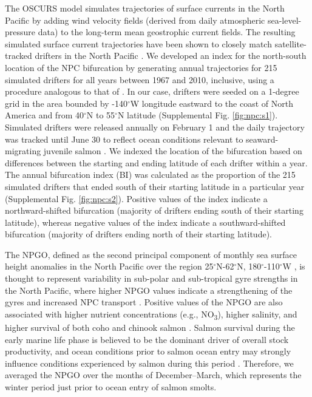 The OSCURS model simulates trajectories of surface currents in the North Pacific
by adding wind velocity fields (derived from daily atmospheric
sea-level-pressure data) to the long-term mean geostrophic current fields. The
resulting simulated surface current trajectories have been shown to closely
match satellite-tracked drifters in the North Pacific \citep{Ingraham1997a}. We
developed an index for the north-south location of the NPC bifurcation by
generating annual trajectories for 215 simulated drifters for all years between
1967 and 2010, inclusive, using a procedure analogous to that of
\citet{Watters2008a}. In our case, drifters were seeded on a 1-degree grid in
the area bounded by -140$^{\circ}$W longitude eastward to the coast of North
America and from 40$^{\circ}$N to 55$^{\circ}$N latitude (Supplemental Fig.
\ref{fig:npc:s1}). Simulated drifters were released annually on February 1 and
the daily trajectory was tracked until June 30 to reflect ocean conditions
relevant to seaward-migrating juvenile salmon \citep{DiLorenzo2013a}. We indexed
the location of the bifurcation based on differences between the starting and
ending latitude of each drifter within a year. The annual bifurcation index (BI)
was calculated as the proportion of the 215 simulated drifters that ended south
of their starting latitude in a particular year (Supplemental Fig.
\ref{fig:npc:s2}). Positive values of the index indicate a northward-shifted
bifurcation (majority of drifters ending south of their starting latitude),
whereas negative values of the index indicate a southward-shifted bifurcation
(majority of drifters ending north of their starting latitude).

The NPGO, defined as the second principal component of monthly sea surface
height anomalies in the North Pacific over the region
25$^{\circ}$N-62$^{\circ}$N, 180$^{\circ}$-110$^{\circ}$W
\citep{Di-Lorenzo2008a}, is thought to represent variability in sub-polar and
sub-tropical gyre strengths in the North Pacific, where higher NPGO values
indicate a strengthening of the gyres and increased NPC transport
\citep{Chhak2009a, Di-Lorenzo2009a, Di-Lorenzo2008a}. Positive values of the
NPGO are also associated with higher nutrient concentrations (e.g.,
NO\textsubscript{3}), higher salinity, and higher survival of both coho and
chinook salmon \citep{Di-Lorenzo2008a, Di-Lorenzo2009a, Kilduff2015}. Salmon
survival during the early marine life phase is believed to be the dominant
driver of overall stock productivity, and ocean conditions prior to salmon ocean
entry may strongly influence conditions experienced by salmon during this period
\citep{Parker1968a, Wertheimer2007a, Yeh2011, DiLorenzo2013a}. Therefore, we
averaged the NPGO over the months of December--March, which represents the
winter period just prior to ocean entry of salmon smolts.

